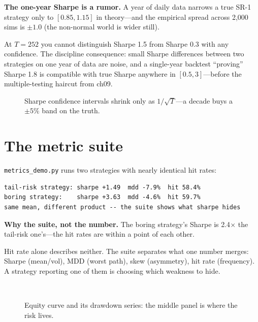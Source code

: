 \begin{example}\label{ex:sharpeci}
\textbf{The one-year Sharpe is a rumor.} A year of daily data narrows a true SR-1
strategy only to $[0.85,1.15]$ in theory---and the empirical spread across 2{,}000
sims is $\pm1.0$ (the non-normal world is wider still).
\begin{solution}
At $T{=}252$ you cannot distinguish Sharpe 1.5 from Sharpe 0.3 with any confidence.
The discipline consequence: small Sharpe differences between two strategies on one
year of data are noise, and a single-year backtest ``proving'' Sharpe 1.8 is compatible
with true Sharpe anywhere in $[0.5,3]$---before the multiple-testing haircut from ch09.
\end{solution}
\end{example}

\begin{figure}[htbp]\centering

\caption{Sharpe confidence intervals shrink only as $1/\sqrt T$---a decade buys a
$\pm5\%$ band on the truth.}
\label{fig:ci}
\end{figure}

\section{The metric suite}\label{sec:suite}

\texttt{metrics\_demo.py} runs two strategies with nearly identical hit rates:
\begin{lstlisting}[numbers=none]
tail-risk strategy: sharpe +1.49  mdd -7.9%  hit 58.4%
boring strategy:    sharpe +3.63  mdd -4.6%  hit 59.7%
same mean, different product -- the suite shows what sharpe hides
\end{lstlisting}

\begin{example}\label{ex:suite}
\textbf{Why the suite, not the number.} The boring strategy's Sharpe is 2.4$\times$ the
tail-risk one's---the hit rates are within a point of each other.
\begin{solution}
Hit rate alone describes neither. The suite separates what one number merges:
Sharpe (mean/vol), MDD (worst path), skew (asymmetry), hit rate (frequency). A strategy
reporting one of them is choosing which weakness to hide.
\end{solution}
\end{example}

\begin{figure}[htbp]\centering
\\[4pt]

\caption{Equity curve and its drawdown series: the middle panel is where the risk lives.}
\label{fig:eqdd}
\end{figure}

